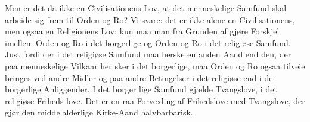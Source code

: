 \documentclass[12pt]{book}
\newcommand{\opage}[1]{\marginnote{\footnotesize\textit{[#1]}}}
\begin{document}
Men er det da ikke en Civilisationens Lov, at det
menneskelige Samfund skal arbeide sig frem til Orden
og Ro? Vi svare: det er ikke alene en Civilisationens,
men ogsaa en Religionens Lov; kun maa man fra
\opage{262}\setcounter{footnote}{0}%
Grunden af gjøre Forskjel imellem Orden og Ro i det
borgerlige og Orden og Ro i det religiøse Samfund.
Just fordi der i det religiøse Samfund maa herske en
anden Aand end den, der paa menneskelige Vilkaar her\-%
sker i det borgerlige, maa Orden og Ro ogsaa tilveie\-%
bringes ved andre Midler og paa andre Betingelser i det
religiøse end i de borgerlige Anliggender. I det borger\-%
lige Samfund gjælde Tvangslove, i det religiøse Friheds\-%
love. Det er en raa Forvexling af Frihedslove med
Tvangslove, der gjør den middelalderlige Kirke-Aand
halvbarbarisk.
\end{document}
